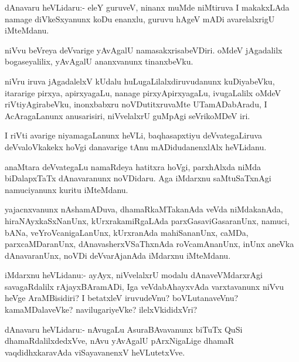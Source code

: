 \documentclass{article}
\begin{document}
\begin{mn}
dAnavaru heVLidaru:- eleY guruveV, ninanx muMde niMtiruva I makakxLAda
namage diVkeSxyanunx koDu enanxlu, guruvu hAgeV mADi avarelalxrigU iMteMdanu.
\end{mn}

\begin{mn}%
niVvu beVreya deVvarige yAvAgalU namasakxrisabeVDiri. oMdeV jAgadalilx
bogaseyalilix, yAvAgalU ananxvanunx tinanxbeVku.
\end{mn}

\begin{mn}
niVru iruva jAgadalelxV kUdalu huLugaLilalxdiruvudanunx kuDiyabeVku,
itararige pirxya, apirxyagaLu, nanage pirxyApirxyagaLu, ivugaLalilx
oMdeV riVtiyAgirabeVku, inonxbabxru noVDutitxruvaMte UTamADabAradu, I
AcAragaLanunx anusarisiri, niVvelalxrU guMpAgi seVrikoMDeV iri.
\end{mn}

\begin{mn}
I riVti avarige niyamagaLanunx heVLi, baqhasapxtiyu deVvategaLiruva
deVvaloVkakekx hoVgi danavarige tAnu mADidudanenxlAlx heVLidanu.
\end{mn}

\begin{mn}
anaMtara deVvategaLu namaRdeya hatitxra hoVgi, parxhAlxda niMda
biDalapxTaTx dAnavaranunx noVDidaru. Aga iMdarxnu saMtuSaTxnAgi
namuciyanunx kuritu iMteMdanu.
\end{mn}

\begin{mn}%
yajacnxvanunx nAshamADuva, dhamaRkaMTakanAda veVda niMdakanAda,
hiraNAyxkaSxNanUnx, kUrxrakamiRgaLAda parxGasaviGasaranUnx, namuci,
bANa, veYroVcanigaLanUnx, kUrxranAda mahiSananUnx, caMDa,
parxcaMDaranUnx, dAnavasherxVSaThxnAda roVcamAnanUnx, inUnx aneVka
dAnavaranUnx, noVDi deVvarAjanAda iMdarxnu iMteMdanu.
\end{mn}

\begin{mn}
iMdarxnu heVLidanu:- ayAyx, niVvelalxrU modalu dAnaveVMdarxrAgi
savagaRdalilx rAjayxBAramADi, Iga veVdabAhayxvAda varxtavanunx niVvu
heVge AraMBisidiri? I betatxleV iruvudeVnu? boVLutanaveVnu?
kamaMDalaveVke? navilugariyeVke? ilelxVkididxVri?
\end{mn}

\begin{mn}
dAnavaru heVLidaru:- nAvugaLu AsuraBAvavanunx biTuTx QuSi
dhamaRdalilxdedxVve, nAvu yAvAgalU pArxNigaLige dhamaR
vaqdidhxkaravAda viSayavanenxV heVLutetxVve.
\end{mn}
\end{document}
